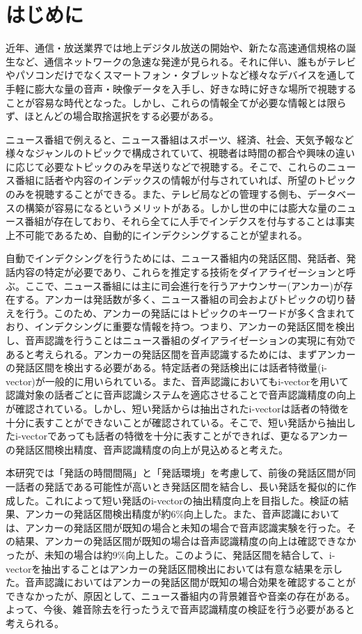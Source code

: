 \chapter{はじめに}

近年、通信・放送業界では地上デジタル放送の開始や、新たな高速通信規格の誕生など、通信ネットワークの急速な発達が見られる。それに伴い、誰もがテレビやパソコンだけでなくスマートフォン・タブレットなど様々なデバイスを通して手軽に膨大な量の音声・映像データを入手し、好きな時に好きな場所で視聴することが容易な時代となった。しかし、これらの情報全てが必要な情報とは限らず、ほとんどの場合取捨選択をする必要がある。\par
ニュース番組で例えると、ニュース番組はスポーツ、経済、社会、天気予報など様々なジャンルのトピックで構成されていて、視聴者は時間の都合や興味の違いに応じて必要なトピックのみを早送りなどで視聴する。そこで、これらのニュース番組に話者や内容のインデックスの情報が付与されていれば、所望のトピックのみを視聴することができる。また、テレビ局などの管理する側も、データベースの構築が容易になるというメリットがある。しかし世の中には膨大な量のニュース番組が存在しており、それら全てに人手でインデクスを付与することは事実上不可能であるため、自動的にインデクシングすることが望まれる。\par
自動でインデクシングを行うためには、ニュース番組内の発話区間、発話者、発話内容の特定が必要であり、これらを推定する技術をダイアライゼーションと呼ぶ。ここで、ニュース番組には主に司会進行を行うアナウンサー(アンカー)が存在する。アンカーは発話数が多く、ニュース番組の司会およびトピックの切り替えを行う。このため、アンカーの発話にはトピックのキーワードが多く含まれており、インデクシングに重要な情報を持つ。つまり、アンカーの発話区間を検出し、音声認識を行うことはニュース番組のダイアライゼーションの実現に有効であると考えられる。アンカーの発話区間を音声認識するためには、まずアンカーの発話区間を検出する必要がある。特定話者の発話検出には話者特徴量(i-vector)が一般的に用いられている。また、音声認識においてもi-vectorを用いて認識対象の話者ごとに音声認識システムを適応させることで音声認識精度の向上が確認されている。しかし、短い発話からは抽出されたi-vectorは話者の特徴を十分に表すことができない\cite{panaiv}ことが確認されている。そこで、短い発話から抽出したi-vectorであっても話者の特徴を十分に表すことができれば、更なるアンカーの発話区間検出精度、音声認識精度の向上が見込めると考えた。\par
本研究では「発話の時間間隔」と「発話環境」を考慮して、前後の発話区間が同一話者の発話である可能性が高いとき発話区間を結合し、長い発話を擬似的に作成した。これによって短い発話のi-vectorの抽出精度向上を目指した。検証の結果、アンカーの発話区間検出精度が約6\%向上した。また、音声認識においては、アンカーの発話区間が既知の場合と未知の場合で音声認識実験を行った。その結果、アンカーの発話区間が既知の場合は音声認識精度の向上は確認できなかったが、未知の場合は約9\%向上した。このように、発話区間を結合して、i-vectorを抽出することはアンカーの発話区間検出においては有意な結果を示した。音声認識においてはアンカーの発話区間が既知の場合効果を確認することができなかったが、原因として、ニュース番組内の背景雑音や音楽の存在がある。よって、今後、雑音除去を行ったうえで音声認識精度の検証を行う必要があると考えられる。